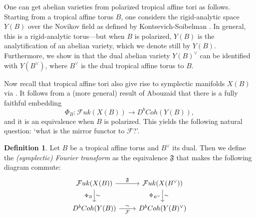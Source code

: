 \documentclass[10pt]{amsart}
\theoremstyle{definition}
\newtheorem{definition}[thm]{Definition}
\theoremstyle{remark}
\newcommand{\mcal}{\mathcal}
\begin{document}
One can get abelian varieties from polarized tropical affine tori as follows.
Starting from a tropical affine torus $B$, one considers the rigid-analytic space $Y(B)$ over the Novikov field as defined by Kontsevich-Soibelman \cite{kontsevich2006affine}.
In general, this is a rigid-analytic torus---but when $B$ is polarized, $Y(B)$ is the analytification of an abelian variety, which we denote still by $Y(B)$.
Furthermore, we show in  that the dual abelian variety $Y(B)^\vee$ can be identified with $Y(B^\vee)$, where $B^\vee$ is the dual tropical affine torus to $B$.

Now recall that tropical affine tori also give rise to symplectic manifolds $X(B)$ via .
It follows from a (more general) result of Abouzaid \cite{abouzaid2014family,abouzaid2017family,abouzaid2021homological} that there is a fully faithful embedding
$$
 \Phi_B: \mcal Fuk(X(B)) \to D^bCoh(Y(B)),
$$
and it is an equivalence when $B$ is polarized.
This yields the following natural question: `what is the mirror functor to $\mathcal F$?'.


\begin{definition}
    Let $B$ be a tropical affine torus and $B^\vee$ its dual.
    Then we define the \emph{(symplectic) Fourier transform} as the equivalence $\mathfrak{F}$ that makes the following diagram commute:
    $$
    \begin{tikzcd}
        \mcal Fuk(X(B)) \arrow[r,"\mathfrak F"] \arrow[d,"\sim","\Phi_B"'] & \mcal Fuk(X(B^\vee)) \arrow[d,"\sim","\Phi_{B^\vee}"']\\
        D^bCoh(Y(B)) \arrow[r,"\sim","\mcal F"'] & D^bCoh(Y(B)^\vee) 
    \end{tikzcd}
    $$
\end{definition}
\end{document}
